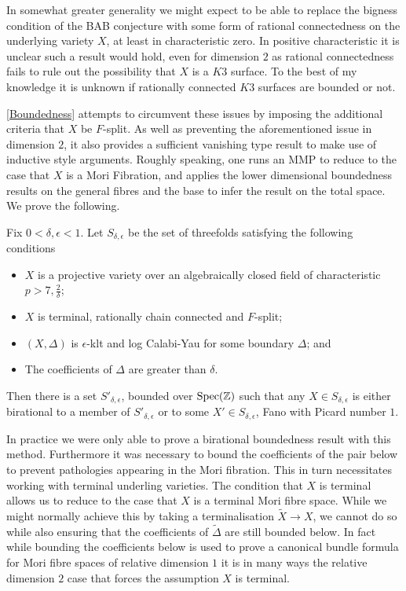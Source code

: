 \documentclass[a4paper,12pt]{book}
\newcommand{\D}{\Delta}
\begin{document}
	In somewhat greater generality we might expect to be able to replace the bigness condition of the BAB conjecture with some form of rational connectedness on the underlying variety $X$, at least in characteristic zero. In positive characteristic it is unclear such a result would hold, even for dimension $2$ as rational connectedness fails to rule out the possibility that $X$ is a $K3$ surface. To the best of my knowledge it is unknown if rationally connected $K3$ surfaces are bounded or not.
	
	\autoref{Boundedness} attempts to circumvent these issues by imposing the additional criteria that $X$ be $F$-split. As well as preventing the aforementioned issue in dimension $2$, it also provides a sufficient vanishing type result to make use of inductive style arguments. Roughly speaking, one runs an MMP to reduce to the case that $X$ is a Mori Fibration, and applies the lower dimensional boundedness results on the general fibres and the base to infer the result on the total space. We prove the following.
	
	\begin{theo}\label{Main_Bound}
		Fix $0 < \delta, \epsilon <1$. Let $S_{\delta,\epsilon}$ be the set of threefolds satisfying the following conditions
		\begin{itemize}
			\item $X$ is a projective variety over an algebraically closed field of characteristic $p >7, \frac{2}{\delta}$;
			\item $X$ is terminal, rationally chain connected and $F$-split;
			\item $(X,\Delta)$ is $\epsilon$-klt and log Calabi-Yau for some boundary $\Delta$; and
			\item The coefficients of $\Delta$ are greater than $\delta$.
		\end{itemize}
		
		Then there is a set $S'_{\delta,\epsilon}$, bounded over $\textup{Spec}(\mathbb{Z})$ such that any $X\in S_{\delta,\epsilon}$ is either birational to a member of $S'_{\delta,\epsilon}$ or to some $X'\in S_{\delta,\epsilon}$, Fano with Picard number $1$. 
	\end{theo}
	
	
	In practice we were only able to prove a birational boundedness result with this method. Furthermore it was necessary to bound the coefficients of the pair below to prevent pathologies appearing in the Mori fibration. This in turn necessitates working with terminal underling varieties. The condition that $X$ is terminal allows us to reduce to the case that $X$ is a terminal Mori fibre space. While we might normally achieve this by taking a terminalisation $\tilde{X} \to X$, we cannot do so while also ensuring that the coefficients of $\tilde{\D}$ are still bounded below. In fact while bounding the coefficients below is used to prove a canonical bundle formula for Mori fibre spaces of relative dimension $1$ it is in many ways the relative dimension $2$ case that forces the assumption $X$ is terminal.
	
\end{document}
